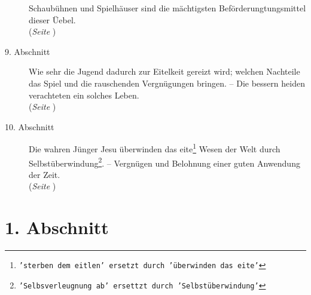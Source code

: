\begin{description}
Schaubühnen und Spielhäuser sind die mächtigsten Beförderungtungsmittel dieser
Üebel.
\\(\textit{Seite \pageref{kap15_ab8}})
\item[9. Abschnitt] Wie sehr die Jugend dadurch zur Eitelkeit gereizt wird;
welchen Nachteile das Spiel und die rauschenden Vergnügungen bringen. -- Die
bessern heiden verachteten ein solches Leben.
\\(\textit{Seite \pageref{kap15_ab9}})
\item[10. Abschnitt] Die wahren Jünger Jesu überwinden das
eite\footnote{\texttt{'sterben dem eitlen' ersetzt durch 'überwinden das eite'}}
Wesen der Welt
durch Selbstüberwindung\footnote{\texttt{'Selbsverleugnung ab'  ersettzt durch
'Selbstüberwindung'}}. -- Vergnügen und Belohnung einer guten Anwendung der
Zeit.
\\(\textit{Seite \pageref{kap15_ab10}})

\end{description}

\newpage

\section{1. Abschnitt} \label{kap15_ab1}

